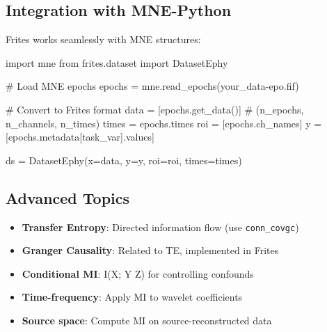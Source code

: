 \documentclass[
  11pt,
  letterpaper,
  oneside,
  openany]{book}
\newenvironment{Shaded}{\begin{snugshade}}{\end{snugshade}}
\newcommand{\CommentTok}[1]{\textcolor[rgb]{0.37,0.37,0.37}{#1}}
\newcommand{\ImportTok}[1]{\textcolor[rgb]{0.00,0.46,0.62}{#1}}
\newcommand{\NormalTok}[1]{\textcolor[rgb]{0.00,0.23,0.31}{#1}}
\newcommand{\OperatorTok}[1]{\textcolor[rgb]{0.37,0.37,0.37}{#1}}
\newcommand{\StringTok}[1]{\textcolor[rgb]{0.13,0.47,0.30}{#1}}
\providecommand{\tightlist}{%
  \setlength{\itemsep}{0pt}\setlength{\parskip}{0pt}}
\begin{document}
\subsection{Integration with
MNE-Python}\label{integration-with-mne-python}

Frites works seamlessly with MNE structures:

\begin{Shaded}
\begin{Highlighting}[]
\ImportTok{import}\NormalTok{ mne}
\ImportTok{from}\NormalTok{ frites.dataset }\ImportTok{import}\NormalTok{ DatasetEphy}

\CommentTok{\# Load MNE epochs}
\NormalTok{epochs }\OperatorTok{=}\NormalTok{ mne.read\_epochs(}\StringTok{\textquotesingle{}your\_data{-}epo.fif\textquotesingle{}}\NormalTok{)}

\CommentTok{\# Convert to Frites format}
\NormalTok{data }\OperatorTok{=}\NormalTok{ [epochs.get\_data()]  }\CommentTok{\# (n\_epochs, n\_channels, n\_times)}
\NormalTok{times }\OperatorTok{=}\NormalTok{ epochs.times}
\NormalTok{roi }\OperatorTok{=}\NormalTok{ [epochs.ch\_names]}
\NormalTok{y }\OperatorTok{=}\NormalTok{ [epochs.metadata[}\StringTok{\textquotesingle{}task\_var\textquotesingle{}}\NormalTok{].values]}

\NormalTok{ds }\OperatorTok{=}\NormalTok{ DatasetEphy(x}\OperatorTok{=}\NormalTok{data, y}\OperatorTok{=}\NormalTok{y, roi}\OperatorTok{=}\NormalTok{roi, times}\OperatorTok{=}\NormalTok{times)}
\end{Highlighting}
\end{Shaded}

\subsection{Advanced Topics}\label{advanced-topics-2}

\begin{itemize}
\tightlist
\item
  \textbf{Transfer Entropy}: Directed information flow (use
  \texttt{conn\_covgc})
\item
  \textbf{Granger Causality}: Related to TE, implemented in Frites
\item
  \textbf{Conditional MI}: I(X; Y \textbar{} Z) for controlling
  confounds
\item
  \textbf{Time-frequency}: Apply MI to wavelet coefficients
\item
  \textbf{Source space}: Compute MI on source-reconstructed data
\end{itemize}
\end{document}
